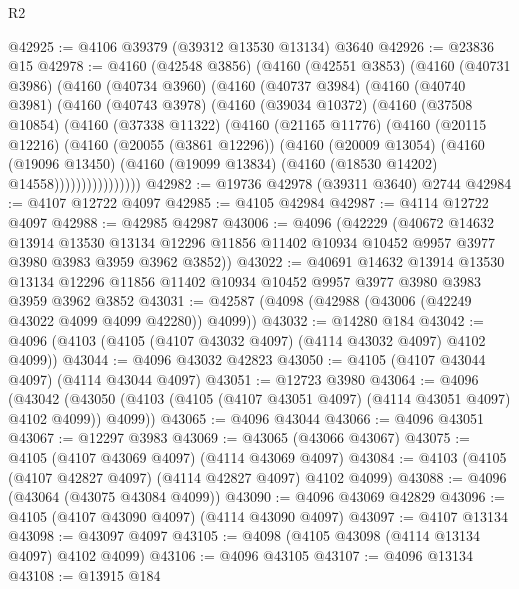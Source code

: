 \begin{lexlean}{R2}
\begin{coremodule}
@42925 := @4106 @39379 (@39312 @13530 @13134) @3640
@42926 := @23836 @15
@42978 := @4160
    (@42548 @3856)
    (@4160
      (@42551 @3853)
      (@4160
        (@40731 @3986)
        (@4160
          (@40734 @3960)
          (@4160
            (@40737 @3984)
            (@4160
              (@40740 @3981)
              (@4160
                (@40743 @3978)
                (@4160
                  (@39034 @10372)
                  (@4160
                    (@37508 @10854)
                    (@4160
                      (@37338 @11322)
                      (@4160
                        (@21165 @11776)
                        (@4160
                          (@20115 @12216)
                          (@4160
                            (@20055 (@3861 @12296))
                            (@4160
                              (@20009 @13054)
                              (@4160
                                (@19096 @13450)
                                (@4160 (@19099 @13834) (@4160 (@18530 @14202) @14558))))))))))))))))
@42982 := @19736 @42978 (@39311 @3640) @2744
@42984 := @4107 @12722 @4097
@42985 := @4105 @42984
@42987 := @4114 @12722 @4097
@42988 := @42985 @42987
@43006 := @4096
    (@42229
      (@40672
        @14632
        @13914
        @13530
        @13134
        @12296
        @11856
        @11402
        @10934
        @10452
        @9957
        @3977
        @3980
        @3983
        @3959
        @3962
        @3852))
@43022 := @40691
    @14632
    @13914
    @13530
    @13134
    @12296
    @11856
    @11402
    @10934
    @10452
    @9957
    @3977
    @3980
    @3983
    @3959
    @3962
    @3852
@43031 := @42587 (@4098 (@42988 (@43006 (@42249 @43022 @4099 @4099 @42280)) @4099))
@43032 := @14280 @184
@43042 := @4096 (@4103 (@4105 (@4107 @43032 @4097) (@4114 @43032 @4097) @4102 @4099))
@43044 := @4096 @43032 @42823
@43050 := @4105 (@4107 @43044 @4097) (@4114 @43044 @4097)
@43051 := @12723 @3980
@43064 := @4096
    (@43042 (@43050 (@4103 (@4105 (@4107 @43051 @4097) (@4114 @43051 @4097) @4102 @4099)) @4099))
@43065 := @4096 @43044
@43066 := @4096 @43051
@43067 := @12297 @3983
@43069 := @43065 (@43066 @43067)
@43075 := @4105 (@4107 @43069 @4097) (@4114 @43069 @4097)
@43084 := @4103 (@4105 (@4107 @42827 @4097) (@4114 @42827 @4097) @4102 @4099)
@43088 := @4096 (@43064 (@43075 @43084 @4099))
@43090 := @4096 @43069 @42829
@43096 := @4105 (@4107 @43090 @4097) (@4114 @43090 @4097)
@43097 := @4107 @13134
@43098 := @43097 @4097
@43105 := @4098 (@4105 @43098 (@4114 @13134 @4097) @4102 @4099)
@43106 := @4096 @43105
@43107 := @4096 @13134
@43108 := @13915 @184

\end{coremodule}
\end{lexlean}
